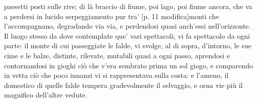 \documentclass[11pt,a4paper]{book}
\begin{document}
paesetti posti sulle rive; di là braccio di fiume, poi lago, poi fiume ancora, che va a perdersi in lucido serpeggiamento pur tra’ [p. 11 modifica]monti che l’accompagnano, degradando via via, e perdendosi quasi anch’essi nell’orizzonte. Il luogo stesso da dove contemplate que’ vari spettacoli, vi fa spettacolo da ogni parte: il monte di cui passeggiate le falde, vi svolge, al di sopra, d’intorno, le sue cime e le balze, distinte, rilevate, mutabili quasi a ogni passo, aprendosi e contornandosi in gioghi ciò che v’era sembrato prima un sol giogo, e comparendo in vetta ciò che poco innanzi vi si rappresentava sulla costa: e l’ameno, il domestico di quelle falde tempera gradevolmente il selvaggio, e orna vie più il magnifico dell’altre vedute.
\pend
\endnumbering
\end{document}

